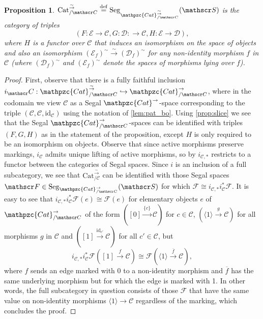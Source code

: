 \documentclass[a4paper, reqno]{amsart}
\newtheorem{prop}[theorem]{Proposition}
\theoremstyle{definition}
\newcommand\cC{\mathscr C}
\newcommand\cD{\mathscr D}
\newcommand\cE{\mathscr E}
\newcommand\cF{\mathscr F}
\newcommand\cS{\mathscr S}
\newcommand\id{\mathrm{id}}
\newcommand\cat{\mathrm{Cat}}
\newcommand\ccat{\mathpzc{Cat}}
\newcommand\bydef{\overset{\mathrm{def}}{=}}
\newcommand\wrr{{\overset{\sim}{\rightarrow}}}
\newcommand\seg{\mathrm{Seg}}
\begin{document}
\begin{prop}\label{prop:cat_ic}
$\cat^\wrr_{/\cC}\bydef\seg_{\ccat^\wrr_{/\cC}}(\cS)$ is the category of triples \[(F:\cE\rightarrow\cC,G:\cD:\rightarrow\cC,H:\cE\rightarrow\cD),\] 
where $H$ is a functor over $\cC$ that induces an isomorphism on the space of objects and also an isomorphism $(\cE_f)^\sim\overset{\sim}{\rightarrow}(\cD_f)^\sim$ for any non-identity morphism $f$ in $\cC$ (where $(\cD_f)^\sim$ and $(\cE_f)^\sim$ denote the spaces of morphisms lying over $f$).
\end{prop}
\begin{proof}
First, observe that there is a fully faithful inclusion $i_\cC:\ccat^\wrr_{/\cC}\hookrightarrow\ccat^\rightarrow_{/\cC}$, where in the codomain we view $\cC$ as a Segal $\ccat^\rightarrow$-space corresponding to the triple $(\cC,\cC,\id_{\cC})$ using the notation of \cref{lem:pat_bo}. Using \cref{prop:slice} we see that the Segal $\ccat^\rightarrow_{/\cC}$-spaces can be identified with triples $(F,G,H)$ as in the statement of the proposition, except $H$ is only required to be an isomorphism on objects. Observe that since active morphisms preserve markings, $i_\cC$ admits unique lifting of active morphisms, so by \cite[Proposition 6.3.]{chu2019homotopy} $i_{\cC,*}$ restricts to a functor between the categories of Segal spaces. Since $i$ is an inclusion of a full subcategory, we see that $\cat^\wrr_{/\cC}$ can be identified with those Segal spaces $\cF\in\seg_{\ccat^\rightarrow_{/\cC}}(\cS)$ for which $\cF\cong i_{\cC,*}i^*_\cC \cF$. It is easy to see that $i_{\cC,*}i^*_\cC \cF(e)\cong \cF(e)$ for elementary objects $e$ of $\ccat^\rightarrow_{/\cC}$ of the form $([0]\xrightarrow{\{c\}}\cC)$ for $c\in\cC$, $(\langle1\rangle\xrightarrow{g}\cC)$ for all morphisms $g$ in $\cC$ and $([1]\xrightarrow{\id_{c'}}\cC)$ for all $c'\in\cC$, but \[i_{\cC,*}i^*_\cC\cF([1]\xrightarrow{f}\cC)\cong \cF(\langle1\rangle\xrightarrow{\overline{f}}\cC),\]
where $f$ sends an edge marked with $0$ to a non-identity morphism and $\overline{f}$ has the same underlying morphism but for which the edge is marked with 1. In other words, the full subcategory in question consists of those $\cF$ that have the same value on non-identity morphisms $\langle1\rangle\rightarrow\cC$ regardless of the marking, which concludes the proof.
\end{proof}
\end{document}
